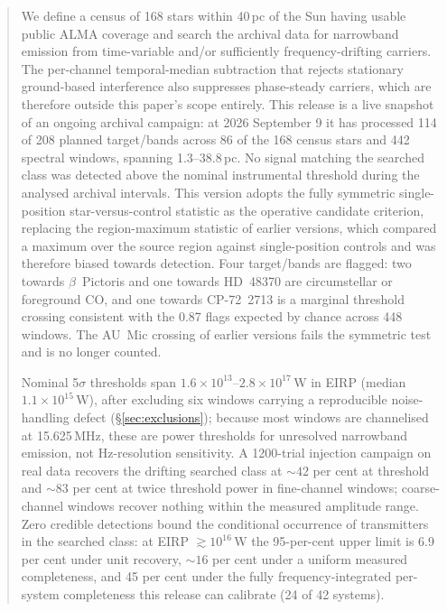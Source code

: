 \documentclass{openjournal}
\begin{document}
\begin{abstract}
We define a census of 168 stars within 40\,pc of the Sun having usable
public ALMA coverage and search the archival data for narrowband
emission from time-variable and/or sufficiently frequency-drifting
carriers. The per-channel temporal-median subtraction that rejects
stationary ground-based interference also suppresses phase-steady
carriers, which are therefore outside this paper's scope entirely.
This release is a live snapshot of an ongoing archival campaign: at
2026 September 9 it has processed 114 of 208 planned target/bands
across 86 of the 168 census stars and 442 spectral windows, spanning
1.3--38.8\,pc. No signal matching the searched class was detected above
the nominal instrumental threshold during the analysed archival
intervals. This version adopts the fully symmetric single-position
star-versus-control statistic as the operative candidate criterion,
replacing the region-maximum statistic of earlier versions, which
compared a maximum over the source region against single-position
controls and was therefore biased towards detection. Four target/bands
are flagged: two towards $\beta$~Pictoris and one towards HD~48370 are
circumstellar or foreground CO, and one towards CP-72~2713 is a
marginal threshold crossing consistent with the 0.87 flags expected by
chance across 448 windows. The AU~Mic crossing of earlier versions
fails the symmetric test and is no longer counted.

Nominal 5$\sigma$ thresholds span $1.6\times10^{13}$--$2.8\times
10^{17}$\,W in EIRP (median $1.1\times10^{15}$\,W), after excluding six
windows carrying a reproducible noise-handling defect
(\S\ref{sec:exclusions}); because most windows are channelised at
15.625\,MHz, these are power thresholds for unresolved narrowband
emission, not Hz-resolution sensitivity. A 1200-trial injection
campaign on real data recovers the drifting searched class at
${\sim}42$ per cent at threshold and ${\sim}83$ per cent at twice
threshold power in fine-channel windows; coarse-channel windows
recover nothing within the measured amplitude range. Zero credible
detections bound the conditional occurrence of transmitters in the
searched class: at EIRP $\gtrsim 10^{16}$\,W the 95-per-cent upper
limit is 6.9 per cent under unit recovery, ${\sim}16$ per cent under
a uniform measured completeness, and 45 per cent under the fully
frequency-integrated per-system completeness this release can
calibrate (24 of 42 systems).
\end{abstract}
\end{document}

